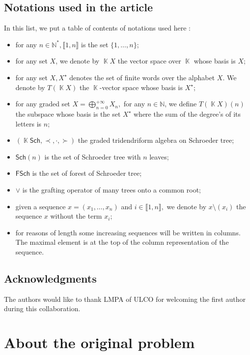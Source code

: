 \documentclass[a4paper,10pt]{amsart}
\DeclareMathOperator{\K}{\mathbb{K}}
\newcommand\Sch{\mathsf{Sch}}
\newcommand\SchF{\mathsf{FSch}}
\newcommand\nn{n}
\newcommand\NN{\mathbb{N}}
\newcommand\pleft{\prec}
\newcommand\pmid{\cdot}
\newcommand\pright{\succ}
\newcommand{\IEM}[2]{\llbracket #1,#2 \rrbracket}
\theoremstyle{definition}
\begin{document}
\subsection{Notations used in the article}

In this list, we put a table of contents of notations used here :
\begin{itemize} %
	\item for any $n\in\NN^*, \IEM{1}{n}$ is the set $\{1,\dots, n\}$;
	\item for any set $X$, we denote by $\K X$ the vector space over $\K$ whose basis is $X$;
	\item for any set $X, X^{\star}$ denotes the set of finite words over the alphabet $X$. We denote by $T(\K X)$ the $\K$-vector space whose basis is $X^{\star}$;
	\item for any graded set $X=\bigoplus_{n=0}^{+\infty} X_n,$ for any $n\in\NN$, we define $T(\K X)(n)$ the subspace whose basis is the set $X^{\star}$ where the sum of the degree's of its letters is $n$; 
	\item $(\K\Sch, \pleft, \pmid, \pright)$ the graded tridendriform algebra on Schroeder tree;
	\item $\Sch(\nn)$ is the set of Schroeder tree with $\nn$ leaves;
	\item $\SchF$ is the set of forest of Schroeder tree;
	\item $\vee$ is the grafting operator of many trees onto a common root;
	\item given a sequence $x=(x_1,\dots, x_n)$ and $i\in\IEM{1}{n},$ we denote by $x\setminus (x_i)$ the sequence $x$ without the term $x_i$;
	\item for reasons of length some increasing sequences will be written in columns. The maximal element is at the top of the column representation of the sequence.
\end{itemize}

\subsection{Acknowledgments}

The authors would like to thank LMPA of ULCO for welcoming the first author during this collaboration.

\section{About the original problem} \label{sec:the_problem}
\end{document}
